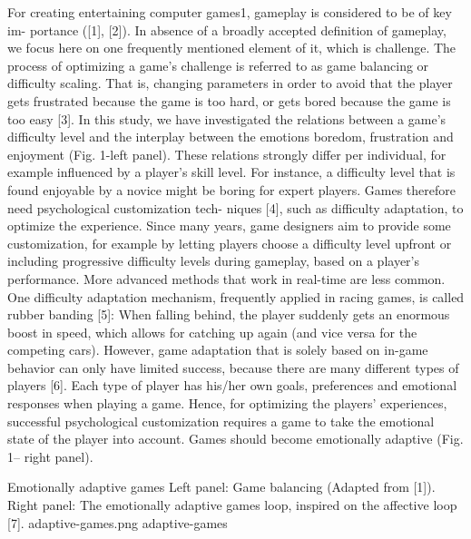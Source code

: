 \documentclass{uofsthesis-cs}
\begin{document}
For creating entertaining computer games1, gameplay is considered to be of key im- portance ([1], [2]). In absence of a broadly accepted definition of gameplay, we focus here on one frequently mentioned element of it, which is challenge. The process of optimizing a game’s challenge is referred to as game balancing or difficulty scaling. That is, changing parameters in order to avoid that the player gets frustrated because the game is too hard, or gets bored because the game is too easy [3]. In this study, we have investigated the relations between a game's difficulty level and the interplay between the emotions boredom, frustration and enjoyment (Fig. 1-left panel). These 
relations strongly differ per individual, for example influenced by a player's skill level. For instance, a difficulty level that is found enjoyable by a novice might be boring for expert players. Games therefore need psychological customization tech- niques [4], such as difficulty adaptation, to optimize the experience. Since many years, game designers aim to provide some customization, for example by letting players choose a difficulty level upfront or including progressive difficulty levels during gameplay, based on a player’s performance.   More advanced methods that work in real-time are less common. One difficulty adaptation mechanism, frequently applied in racing games, is called rubber banding [5]: When falling behind, the player suddenly gets an enormous boost in speed, which allows for catching up again (and vice versa for the competing cars). However, game adaptation that is solely based on in-game behavior can only have limited success, because there are many different types of players [6]. Each type of player has his/her own goals, preferences and emotional responses when playing a game. Hence, for optimizing the players' experiences, successful psychological customization requires a game to take the emotional state of the player into account. Games should become emotionally adaptive (Fig. 1– right panel). 

\img
{Emotionally adaptive games}
{Left panel: Game balancing (Adapted from [1]). Right panel: The emotionally adaptive games loop, inspired on the affective loop [7]. }
{adaptive-games.png}
{adaptive-games}
\end{document}
